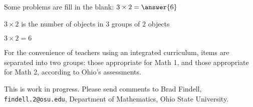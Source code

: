 \documentclass[nooutcomes]{ximera}
\begin{document}
\begin{example}
Some problems are fill in the blank: 
  $3\times 2 = \answer{6}$   
  \begin{hint}
    $3 \times 2$ is the number of objects in $3$ groups of $2$ objects
  \end{hint}
  \begin{hint}
    \begin{image}
    \end{image}
  \end{hint}
  \begin{hint}
    $3\times 2=6$
  \end{hint}
\end{example}


For the convenience of teachers using an integrated curriculum, items are separated into two groups: those appropriate for Math 1, and those appropriate for Math 2, according to Ohio's assessments.  

This is work in progress.  Please send comments to Brad Findell, \texttt{findell.2@osu.edu}, Department of Mathematics, Ohio State University.  
\end{document}
